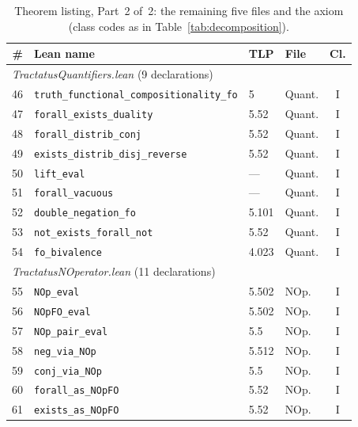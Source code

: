 \documentclass[jsl,bibother]{asl}
\theoremstyle{definition}
\theoremstyle{remark}
\begin{document}
\begin{table}[p]
\centering
\footnotesize
\caption{Theorem listing, Part~2 of~2: the remaining five files and
  the axiom (class codes as in Table~\ref{tab:decomposition}).}
\label{tab:decomposition2}
\begin{tabular}{@{}rlllc@{}}
\toprule
\# & \textbf{Lean name} & \textbf{TLP} & \textbf{File} & \textbf{Cl.} \\
\midrule
\multicolumn{5}{l}{\emph{TractatusQuantifiers.lean} (9 declarations)} \\
\midrule
46 & \texttt{truth\_functional\_compositionality\_fo}    & 5       & Quant. & I \\
47 & \texttt{forall\_exists\_duality}                    & 5.52    & Quant. & I \\
48 & \texttt{forall\_distrib\_conj}                      & 5.52    & Quant. & I \\
49 & \texttt{exists\_distrib\_disj\_reverse}             & 5.52    & Quant. & I \\
50 & \texttt{lift\_eval}                                 & ---     & Quant. & I \\
51 & \texttt{forall\_vacuous}                            & ---     & Quant. & I \\
52 & \texttt{double\_negation\_fo}                       & 5.101   & Quant. & I \\
53 & \texttt{not\_exists\_forall\_not}                   & 5.52    & Quant. & I \\
54 & \texttt{fo\_bivalence}                              & 4.023   & Quant. & I \\
\midrule
\multicolumn{5}{l}{\emph{TractatusNOperator.lean} (11 declarations)} \\
\midrule
55 & \texttt{NOp\_eval}                                 & 5.502   & NOp. & I \\
56 & \texttt{NOpFO\_eval}                               & 5.502   & NOp. & I \\
57 & \texttt{NOp\_pair\_eval}                           & 5.5     & NOp. & I \\
58 & \texttt{neg\_via\_NOp}                             & 5.512   & NOp. & I \\
59 & \texttt{conj\_via\_NOp}                            & 5.5     & NOp. & I \\
60 & \texttt{forall\_as\_NOpFO}                         & 5.52    & NOp. & I \\
61 & \texttt{exists\_as\_NOpFO}                         & 5.52    & NOp. & I \\

\end{tabular}
\end{table}
\end{document}
